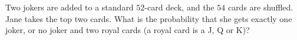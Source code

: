 Two jokers are added to a standard $52$-card deck, and the $54$ cards are shuffled. Jane takes the top two cards. What is the probability that she gets exactly one joker, or no joker and two royal cards (a royal card is a J, Q or K)?
